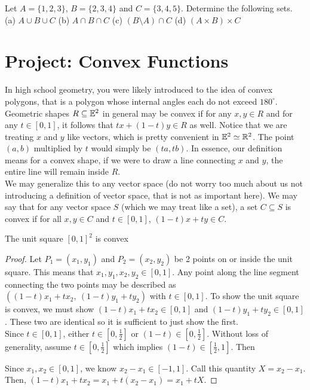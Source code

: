 \begin{exercise}
  Let $A = \{1, 2, 3\}$, $B = \{2, 3, 4\}$ and $C = \{3, 4, 5\}$.
  Determine the following sets. \\
  (a) $A \cup B \cup C$ \quad
  (b) $A \cap B \cap C$ \quad
  (c) $(B \setminus A) \cap C$ \quad
  (d) $(A \times B) \times C$
\end{exercise}

\section*{Project: \textbf{Convex Functions}}
\setcounter{section}{6}

In high school geometry, you were likely introduced to the idea of convex polygons, that is a polygon whose internal angles each do not exceed $180^\circ$. Geometric shapes $R \subseteq \mathbb{E}^2$ in general may be convex if for any $x,y\in R$ and for any $t\in[0,1]$, it follows that $tx+(1-t)y\in R$ as well. Notice that we are treating $x$ and $y$ like vectors, which is pretty convenient in $\mathbb{E}^2\simeq \mathbb{R}^2$. The point $(a,b)$ multiplied by $t$ would simply be $(ta,tb)$. In essence, our definition means for a convex shape, if we were to draw a line connecting $x$ and $y$, the entire line will remain inside $R$. \\

We may generalize this to any vector space (do not worry too much about us not introducing a definition of vector space, that is not as important here). We may say that for any vector space $S$ (which we may treat like a set), a set $C\subseteq S$ is convex if for all $x,y\in C$ and $t\in[0,1]$, $(1-t)x+ty\in C$.

\begin{example}[A region in $\R^2$]
    The unit square $[0,1]^2$ is convex
    \begin{proof}
        Let $P_1=(x_1,y_1)$ and $P_2=(x_2,y_2)$ be 2 points on or inside the unit square. This means that $x_1,y_1,x_2,y_2\in[0,1]$. Any point along the line segment connecting the two points may be described as \\$((1-t)x_1+tx_2,\ (1-t)y_1+ty_2)$ with $t\in[0,1]$. To show the unit square is convex, we must show $(1-t)x_1+tx_2\in[0,1]$ and $(1-t)y_1+ty_2\in[0,1]$. These two are identical so it is sufficient to just show the first.\\

        Since $t\in[0,1]$, either $t\in[0,\frac{1}{2}]$ or $(1-t)\in[0,\frac{1}{2}]$. Without loss of generality, assume $t\in[0,\frac{1}{2}]$ which implies $(1-t)\in[\frac{1}{2},1]$. Then 
        
        Since $x_1,x_2\in[0,1]$, we know $x_2-x_1\in[-1,1]$. Call this quantity $X=x_2-x_1$. Then, $(1-t)x_1+tx_2 = x_1 + t(x_2-x_1)=x_1+tX$. 
    \end{proof}
\end{example}